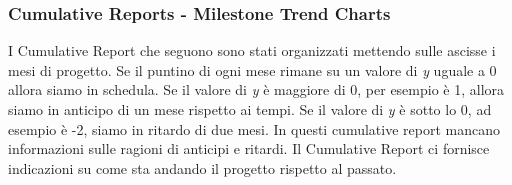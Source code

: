 \subsubsection{Cumulative Reports - Milestone Trend Charts}
I Cumulative Report che seguono sono stati organizzati mettendo sulle ascisse i mesi di progetto. Se il puntino di ogni mese rimane su un valore di \textit{y} uguale a 0 allora siamo in schedula. Se il valore di \textit{y} è maggiore di 0, per esempio è 1, allora siamo in anticipo di un mese rispetto ai tempi. Se il valore di \textit{y} è sotto lo 0, ad esempio è -2, siamo in ritardo di due mesi. In questi cumulative report mancano informazioni sulle ragioni di anticipi e ritardi. Il Cumulative Report ci fornisce indicazioni su come sta andando il progetto rispetto al passato.\newline

